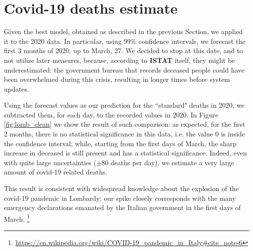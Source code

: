 \documentclass[11pt,a4paper,final]{paper}
\begin{document}

\section{Covid-19 deaths estimate}

Given the best model, obtained as described in the previous Section, we applied it to the 2020 data. In particular, using $99\%$ confidence intervals, we forecast the first 3 months of 2020, up to March, 27. We decided to stop at this date, and to not utilize later measures, because, according to \textbf{ISTAT} itself, they might be underestimated: the government bureau  that records deceased people could have been overwhelmed during this crisis, resulting in longer times before system updates. 

Using the forecast values as our prediction for the ``standard" deaths in 2020, we subtracted them, for each day, to the recorded values in 2020. In Figure \ref{fig:lomb_clean} we show the result of such comparison: as expected, for the first 2 months, there is no statistical significance in this data, i.e. the value $0$ is inside the confidence interval; while, starting from the first days of March, the sharp increase in deceased is still present and has a statistical significance. Indeed, even with quite large uncertainties ($\pm 80$ deaths per day), we estimate a very large amount of covid-19 related deaths.

This result is consistent with widespread knowledge about the explosion of the covid-19 pandemic in Lombardy: our spike closely corresponds with the many emergency declarations emanated by the Italian government in the first days of March. \footnote{\url{https://en.wikipedia.org/wiki/COVID-19_pandemic_in_Italy#cite_note-6}} 
\end{document}
